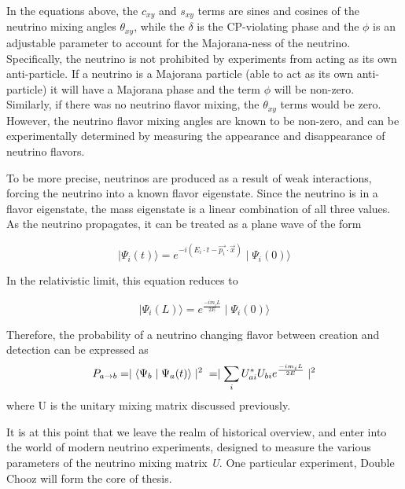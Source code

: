 In the equations above, the \emph{$c_{xy}$} and \emph{$s_{xy}$} terms are sines and cosines of the neutrino mixing angles $\theta_{xy}$, while the $\delta$ is the CP-violating phase and the $\phi$ is an adjustable parameter to account for the Majorana-ness of the neutrino. Specifically, the neutrino is not prohibited by experiments from acting as its own anti-particle. If a neutrino is a Majorana particle (able to act as its own anti-particle) it will have a Majorana phase and the term $\phi$ will be non-zero.  Similarly, if there was no neutrino flavor mixing, the $\theta_{xy}$ terms would be zero. However, the neutrino flavor mixing angles are known to be non-zero, and can be experimentally determined by measuring the appearance and disappearance of neutrino flavors.

To be more precise, neutrinos are produced as a result of weak interactions, forcing the neutrino into a known flavor eigenstate. Since the neutrino is in a flavor eigenstate, the mass eigenstate is a linear combination of all three values. As the neutrino propagates, it can be treated as a plane wave of the form

\begin{equation}
 \mid \Psi_i (t) \rangle  =  e^{ -i(E_{i}  \cdot t - \overrightarrow{p_{i}} \cdot \overrightarrow{x}) } \mid \Psi_i (0) \rangle
 \end{equation}

In the relativistic limit, this equation reduces to 

\begin{equation}
 \mid \Psi_i (L) \rangle  =  e^{\frac{-im_i L}{2E}} \mid  \Psi_i (0) \rangle
 \end{equation}

Therefore, the probability of a neutrino changing flavor between creation and detection can be expressed as 
\begin{equation}
P_{a \rightarrow b} = \mid \langle \Psi_b \mid \Psi_a (t) \rangle \mid^2 \\
= \mid \sum_{i} U^{*}_{ai} U_{bi}e^{\frac{-im_i L}{2E}} \mid ^2
\end{equation}
where U is the unitary mixing matrix discussed previously.  

It is at this point that we leave the realm of historical overview, and enter into the world of modern neutrino experiments, designed to measure the various parameters of the neutrino mixing matrix \emph{U}. One particular experiment, Double Chooz will form the core of thesis. 

